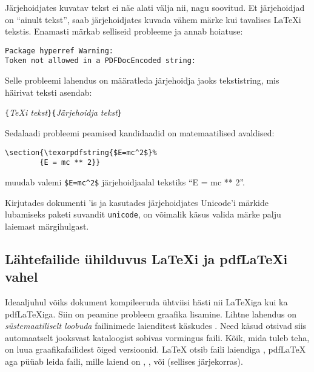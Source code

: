 Järjehoidjates kuvatav tekst ei näe alati välja nii, nagu soovitud. Et
järjehoidjad on "`ainult tekst"', saab järjehoidjates kuvada vähem
märke kui tavalises \LaTeX i tekstis. Enamasti  märkab
selliseid probleeme ja annab hoiatuse:
\begin{code}
\begin{verbatim}
Package hyperref Warning:
Token not allowed in a PDFDocEncoded string:
\end{verbatim}
\end{code}
Selle probleemi lahendus on määratleda järjehoidja jaoks tekstistring,
mis häirivat teksti asendab:
\begin{lscommand}
\verb|{|\emph{\TeX i tekst}\verb|}{|\emph{Järjehoidja tekst}\verb|}|
\end{lscommand}
\noindent Sedalaadi probleemi peamised kandidaadid on matemaatilised
avaldised:
\begin{code}
\begin{verbatim}
\section{\texorpdfstring{$E=mc^2$}%
        {E = mc ** 2}}
\end{verbatim}
\end{code}
muudab valemi \verb+$E=mc^2$+ järjehoidjaalal tekstiks "`E = mc **
2"'.

Kirjutades dokumenti 'is ja kasutades järjehoidjates
Unicode'i märkide lubamiseks paketi  suvandit
\verb+unicode+, on võimalik käsus  valida märke palju
laiemast märgihulgast.

\subsection{Lähtefailide ühilduvus \LaTeX i ja pdf\LaTeX i vahel}
\label{sec:pdfcompat}

Ideaaljuhul võiks dokument kompileeruda ühtviisi hästi nii \LaTeX iga
kui ka pdf\LaTeX iga. Siin on peamine
probleem graafika lisamine. Lihtne lahendus on
\emph{süstemaatiliselt loobuda} failinimede laienditest käskudes
. Need käsud otsivad siis automaatselt jooksvast
kataloogist sobivas vormingus faili. Kõik, mida tuleb teha, on luua
graafikafailidest õiged versioonid. \LaTeX{} otsib faili laiendiga
, pdf\LaTeX{} aga püüab leida faili, mille laiend on ,
,  või  (sellises järjekorras).

